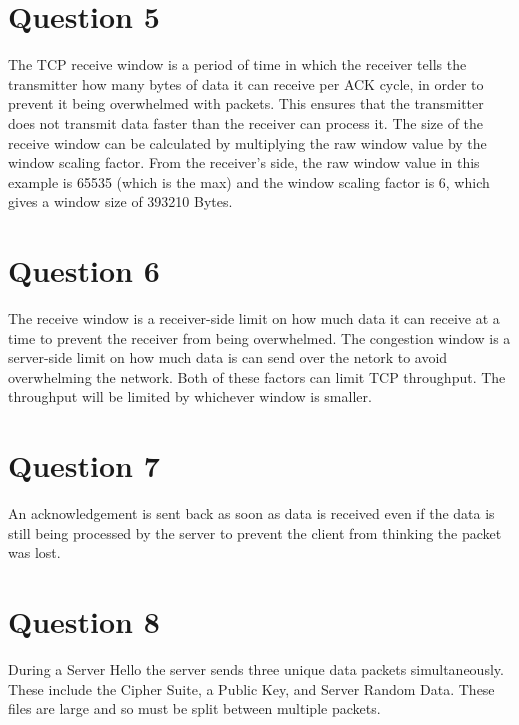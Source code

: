 \documentclass[11pt,a4paper,twocolumn]{article}
\begin{document}
\section*{Question 5}
\begin{flushleft}
The TCP receive window is a period of time in which the receiver tells the transmitter how many bytes of data it can receive per ACK cycle, in order to prevent it being overwhelmed with packets. 
This ensures that the transmitter does not transmit data faster than the receiver can process it.
The size of the receive window can be calculated by multiplying the raw window value by the window scaling factor. 
From the receiver's side, the raw window value in this example is 65535 (which is the max) and the window scaling factor is 6, which gives a window size of 393210 Bytes.
\end{flushleft}

\section*{Question 6}
\begin{flushleft}
The receive window is a receiver-side limit on how much data it can receive at a time to prevent the receiver from being overwhelmed.
The congestion window is a server-side limit on how much data is can send over the netork to avoid overwhelming the network.
Both of these factors can limit TCP throughput. The throughput will be limited by whichever window is smaller.
\end{flushleft}

\section*{Question 7}
\begin{flushleft}
An acknowledgement is sent back as soon as data is received even if the data is still being processed by the server to prevent the client from thinking the packet was lost.
\end{flushleft}

\section*{Question 8}
\begin{flushleft}
During a Server Hello the server sends three unique data packets simultaneously. These include the Cipher Suite, a Public Key, and Server Random Data. 
These files are large and so must be split between multiple packets.
\end{flushleft}
\end{document}
